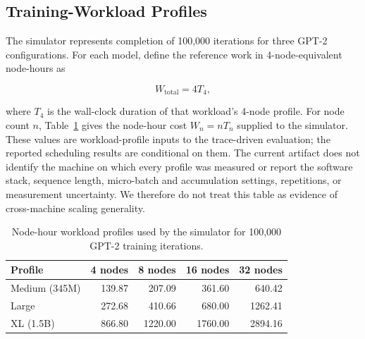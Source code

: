 \subsection{Training-Workload Profiles}
\label{sec:impl:workload}

The simulator represents completion of 100,000 iterations for three GPT-2
configurations.  For each model, define the reference work in 4-node-equivalent
node-hours as

\begin{equation}
    W_{\mathrm{total}} = 4T_4,
\end{equation}

where $T_4$ is the wall-clock duration of that workload's 4-node profile.  For
node count $n$, Table~\ref{tab:scaling_efficiency} gives the node-hour cost
$W_n=nT_n$ supplied to the simulator.  These values are workload-profile
inputs to the trace-driven evaluation; the reported scheduling results are
conditional on them.
The current artifact does not identify the machine on which every profile was
measured or report the software stack, sequence length, micro-batch and
accumulation settings, repetitions, or measurement uncertainty.  We therefore
do not treat this table as evidence of cross-machine scaling generality.

\begin{table}[t]
    \centering
    \caption{Node-hour workload profiles used by the simulator for 100,000
    GPT-2 training iterations.}
    \label{tab:scaling_efficiency}
    \begin{tabular}{lrrrr}
        \toprule
        \textbf{Profile} & \textbf{4 nodes} & \textbf{8 nodes}
                         & \textbf{16 nodes} & \textbf{32 nodes} \\
        \midrule
        Medium (345M) & 139.87 & 207.09 & 361.60 & 640.42 \\
        Large         & 272.68 & 410.66 & 680.00 & 1262.41 \\
        XL (1.5B)     & 866.80 & 1220.00 & 1760.00 & 2894.16 \\
        \bottomrule
    \end{tabular}
\end{table}

